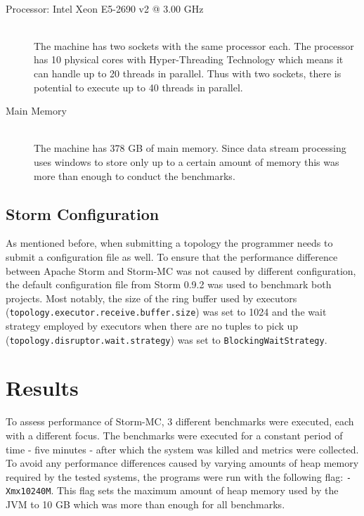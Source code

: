 \begin{description}
	\item[Processor: Intel\textsuperscript{\textregistered} Xeon\textsuperscript{\textregistered} E5-2690 v2 @ 3.00 GHz] \hfill \\
	The machine has two sockets with the same processor each. The processor has 10 physical cores with Hyper-Threading Technology which means it can handle up to 20 threads in parallel. Thus with two sockets, there is potential to execute up to 40 threads in parallel.
	\item[Main Memory] \hfill \\
	The machine has 378 GB of main memory. Since data stream processing uses windows to store only up to a certain amount of memory this was more than enough to conduct the benchmarks.
\end{description}

\subsection{Storm Configuration}

As mentioned before, when submitting a topology the programmer needs to submit a configuration file as well. To ensure that the performance difference between Apache Storm and Storm-MC was not caused by different configuration, the default configuration file from Storm 0.9.2 was used to benchmark both projects. Most notably, the size of the ring buffer used by executors \\ (\texttt{topology.executor.receive.buffer.size}) was set to 1024 and the wait strategy employed by executors when there are no tuples to pick up \\ (\texttt{topology.disruptor.wait.strategy}) was set to \texttt{BlockingWaitStrategy}.

\section{Results}
\label{sec:performance}

To assess performance of Storm-MC, 3 different benchmarks were executed, each with a different focus. The benchmarks were executed for a constant period of time - five minutes - after which the system was killed and metrics were collected. To avoid any performance differences caused by varying amounts of heap memory required by the tested systems, the programs were run with the following flag: \texttt{-Xmx10240M}. This flag sets the maximum amount of heap memory used by the JVM to 10 GB which was more than enough for all benchmarks.

